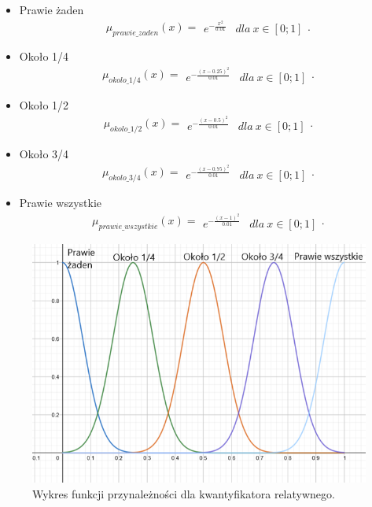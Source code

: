 \documentclass{classrep}
\begin{document}
\begin{itemize}
        \item Prawie żaden
        \begin{equation}
            \mu_{prawie\_zaden}(x) = \begin{matrix} e ^ {-\frac{x^2}{0.01}} & dla \: x\in [0;1]  \end{matrix}.
        \end{equation}
        \item Około 1/4
        \begin{equation}
            \mu_{okolo\_1/4}(x) =  \begin{matrix} e ^ {-\frac{(x - 0.25)^2}{0.01}} & dla \: x\in [0;1]  \end{matrix}.
        \end{equation}
        \item Około 1/2
        \begin{equation}
            \mu_{okolo\_1/2}(x) = \begin{matrix} e ^ {-\frac{(x - 0.5)^2}{0.01}} & dla \: x\in [0;1]  \end{matrix}.
        \end{equation}
        \item Około 3/4
        \begin{equation}
            \mu_{okolo\_3/4}(x) = \begin{matrix} e ^ {-\frac{(x - 0.75)^2}{0.01}} & dla \: x\in [0;1]  \end{matrix}.
        \end{equation}
        \item Prawie wszystkie
        \begin{equation}
            \mu_{prawie\_wszystkie}(x) = \begin{matrix} e ^ {-\frac{(x - 1)^2}{0.01}} & dla \: x\in [0;1]  \end{matrix}.
        \end{equation}
    \end{itemize}
\begin{figure}[H]
    \centering
    \includegraphics[width=14cm]{wykres_kwantyfikator_relatywny.png}
    \caption{Wykres funkcji przynależności dla kwantyfikatora relatywnego.}
    \label{rysunek:kwantyfikator_relatywny}
\end{figure}
\end{document}
